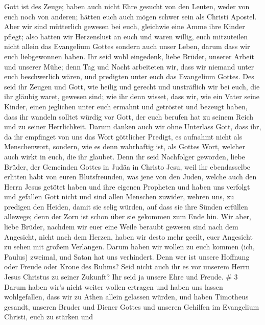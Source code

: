 Gott ist des Zeuge;  haben auch nicht Ehre gesucht von den
Leuten, weder von euch noch von anderen;  hätten euch auch
mögen schwer sein als Christi Apostel. Aber wir sind mütterlich gewesen
bei euch, gleichwie eine Amme ihre Kinder pflegt;  also
hatten wir Herzenslust an euch und waren willig, euch mitzuteilen nicht
allein das Evangelium Gottes sondern auch unser Leben, darum dass wir
euch liebgewonnen haben.  Ihr seid wohl eingedenk, liebe
Brüder, unserer Arbeit und unserer Mühe; denn Tag und Nacht arbeiteten
wir, dass wir niemand unter euch beschwerlich wären, und predigten unter
euch das Evangelium Gottes.  Des seid ihr Zeugen und Gott,
wie heilig und gerecht und unsträflich wir bei euch, die ihr gläubig
waret, gewesen sind;  wie ihr denn wisset, dass wir, wie
ein Vater seine Kinder, einen jeglichen unter euch ermahnt und getröstet
 und bezeugt haben, dass ihr wandeln solltet würdig vor
Gott, der euch berufen hat zu seinem Reich und zu seiner Herrlichkeit.
 Darum danken auch wir ohne Unterlass Gott, dass ihr, da
ihr empfinget von uns das Wort göttlicher Predigt, es aufnahmt nicht als
Menschenwort, sondern, wie es denn wahrhaftig ist, als Gottes Wort,
welcher auch wirkt in euch, die ihr glaubet.  Denn ihr seid
Nachfolger geworden, liebe Brüder, der Gemeinden Gottes in Judäa in
Christo Jesu, weil ihr ebendasselbe erlitten habt von euren
Blutsfreunden, was jene von den Juden,  welche auch den
Herrn Jesus getötet haben und ihre eigenen Propheten und haben uns
verfolgt und gefallen Gott nicht und sind allen Menschen zuwider,
 wehren uns, zu predigen den Heiden, damit sie selig
würden, auf dass sie ihre Sünden erfüllen allewege; denn der Zorn ist
schon über sie gekommen zum Ende hin.  Wir aber, liebe
Brüder, nachdem wir euer eine Weile beraubt gewesen sind nach dem
Angesicht, nicht nach dem Herzen, haben wir desto mehr geeilt, euer
Angesicht zu sehen mit großem Verlangen.  Darum haben wir
wollen zu euch kommen (ich, Paulus) zweimal, und Satan hat uns
verhindert.  Denn wer ist unsere Hoffnung oder Freude oder
Krone des Ruhms? Seid nicht auch ihr es vor unserem Herrn Jesus Christus
zu seiner Zukunft?  Ihr seid ja unsere Ehre und Freude. \#
3  Darum haben wir's nicht weiter wollen ertragen und haben
uns lassen wohlgefallen, dass wir zu Athen allein gelassen würden,
 und haben Timotheus gesandt, unseren Bruder und Diener
Gottes und unseren Gehilfen im Evangelium Christi, euch zu stärken und
